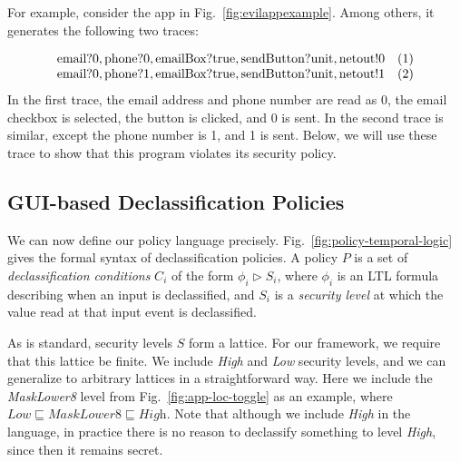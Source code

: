 \documentclass{entcs} \usepackage{entcsmacro}
\newcommand{\code}[1]{\text{\lstinline!#1!}}
\newcommand{\hyperltltwo}{HyperLTL\xspace}
\begin{document}
For example, consider the app in Fig.~\ref{fig:evilappexample}. Among
others, it generates the following two traces:

\begin{displaymath}
  \begin{array}{cl}
    \code{email}?0, \code{phone}?0, \code{emailBox}?\code{true},
    \code{sendButton}?\code{unit}, \code{netout}!0 & (1) \\
    \code{email}?0, \code{phone}?1, \code{emailBox}?\code{true},
    \code{sendButton}?\code{unit}, \code{netout}!1 & (2) \\
  \end{array}
\end{displaymath}
\lstset{language=Java}
In the first trace, the email address and phone number are read as 0, the
email checkbox is selected, the button is clicked, and 0 is sent. In
the second trace is similar, except the phone number is 1, and 1 is
sent. Below, we will use these trace to show that this program
violates its security policy.

\subsection{GUI-based Declassification Policies}
\label{sec:policies}



We can now define our policy language precisely.
Fig.~\ref{fig:policy-temporal-logic} gives the formal syntax of
declassification policies.  A policy $P$ is a set of
\emph{declassification conditions} $C_i$ of the form $\phi_i\rhd S_i$,
where $\phi_i$ is an LTL formula describing when an input is
declassified, and $S_i$ is a \emph{security level} at which the value
read at that input event is declassified.

As is standard, security levels $S$ form a lattice. 
For our framework, we require that this lattice be finite.
We include
\textit{High} and \textit{Low} security levels, and we can generalize to
arbitrary lattices in a straightforward way. Here we include the
\textit{MaskLower8} level from Fig.~\ref{fig:app-loc-toggle} as an
example, where $\textit{Low} \sqsubseteq \textit{MaskLower8} \sqsubseteq \textit{High}$.
Note that although we include \textit{High} in the language, in practice there
is no reason to declassify something to level \textit{High}, since then it
remains secret.
\end{document}
